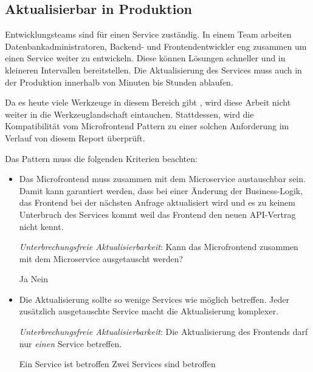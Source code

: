 
\subsection{Aktualisierbar in Produktion}


Entwicklungsteams sind für einen Service zuständig. In einem Team arbeiten Datenbankadministratoren, Backend- und Frontendentwickler eng zusammen um einen Service weiter zu entwickeln. Diese können Lösungen schneller und in kleineren Intervallen bereitstellen. Die Aktualisierung des  Services muss auch in der Produktion innerhalb von Minuten bis Stunden ablaufen. \cite{microservicemanifesto}

Da es heute viele Werkzeuge in diesem Bereich gibt \cite{ieeeJournal2018}, wird diese Arbeit nicht weiter in die Werkzeuglandschaft eintauchen. Stattdessen, wird die Kompatibilität vom Microfrontend Pattern zu einer solchen Anforderung im Verlauf von diesem Report überprüft.

Das Pattern  muss die folgenden Kriterien beachten:
\begin{itemize}
    \item Das Microfrontend muss zusammen mit dem Microservice austauschbar sein. Damit kann garantiert werden, dass bei einer Änderung der Business-Logik, das Frontend bei der nächsten Anfrage aktualisiert wird und es zu keinem Unterbruch des Services kommt weil das Frontend den neuen API-Vertrag nicht kennt.
    
    \textit{Unterbrechungsfreie Aktualisierbarkeit}:  Kann das Microfrontend zusammen mit dem Microservice ausgetauscht werden?
    \begin{itemize}
        \pro Ja
        \con Nein
    \end{itemize}
    \item Die Aktualisierung sollte so wenige Services wie möglich betreffen. Jeder zusätzlich ausgetauschte Service macht die Aktualisierung komplexer.
    
    \textit{Unterbrechungsfreie Aktualisierbarkeit}:  Die Aktualisierung des Frontends darf nur \textit{einen} Service betreffen.
    \begin{itemize}
        \pro Ein Service ist betroffen
        \con Zwei Services sind betroffen
    \end{itemize}
\end{itemize}

